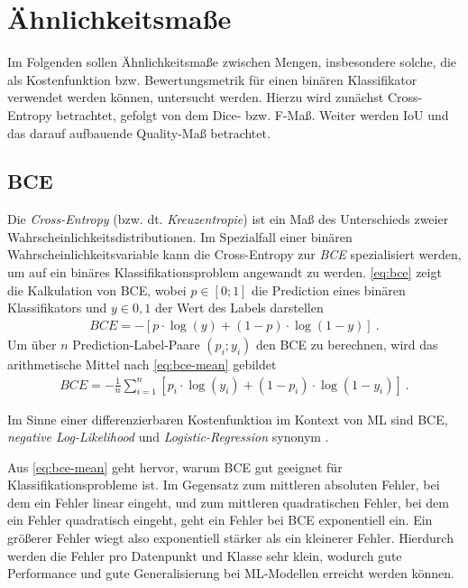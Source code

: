 \section{Ähnlichkeitsmaße}

Im Folgenden sollen Ähnlichkeitsmaße zwischen Mengen, insbesondere 
solche, die als Kostenfunktion bzw. Bewertungsmetrik für einen binären 
Klassifikator verwendet werden können, untersucht werden. Hierzu wird zunächst Cross-Entropy betrachtet,
gefolgt von dem Dice- bzw. F-Maß. Weiter werden \ac{IoU} und das darauf aufbauende Quality-Maß betrachtet.

\subsection{\acf{BCE}}

Die \textit{Cross-Entropy} (bzw. dt. \textit{Kreuzentropie}) ist ein Maß des Unterschieds zweier
Wahrscheinlichkeitsdistributionen. Im Spezialfall einer binären Wahrscheinlichkeitsvariable 
kann die Cross-Entropy zur \textit{\acf{BCE}} spezialisiert werden, um auf ein binäres 
Klassifikationsproblem angewandt zu werden. 
\autoref{eq:bce} zeigt die Kalkulation von \ac{BCE}, wobei $p \in [0;1]$ die Prediction 
eines binären Klassifikators und $y \in {0,1}$ der Wert des Labels darstellen
\begin{align}
	\label{eq:bce} BCE = -[p \cdot \log(y) + (1-p) \cdot \log(1-y) ]~.
\end{align} 
Um über $n$ Prediction-Label-Paare $(p_i; y_i)$ den \ac{BCE} zu berechnen, wird das arithmetische Mittel nach
\autoref{eq:bce-mean} gebildet \cites[S.~82]{Cybenko.1999}[S.~57--59]{Murphy.2012}
\begin{align}
	\label{eq:bce-mean} BCE = -\frac{1}{n}\sum_{i = 1}^{n}[p_i \cdot \log(y_i) + (1-p_i) \cdot \log(1-y_i) ]~.
\end{align}

Im Sinne einer differenzierbaren Kostenfunktion im Kontext von \ac{ML} sind \ac{BCE},
\textit{negative Log-Likelihood} und \textit{Logistic-Regression} synonym \cite[S.~249]{Murphy.2012}. 

Aus \autoref{eq:bce-mean} geht hervor, warum \ac{BCE} gut geeignet für Klassifikationsprobleme ist.
Im Gegensatz zum mittleren absoluten Fehler, bei dem ein Fehler linear eingeht, und zum mittleren quadratischen Fehler,
bei dem ein Fehler quadratisch eingeht, geht ein Fehler bei \ac{BCE} exponentiell ein. 
Ein größerer Fehler wiegt also exponentiell stärker als ein kleinerer Fehler. 
Hierdurch werden die Fehler pro Datenpunkt und Klasse sehr klein, 
wodurch gute Performance und gute Generalisierung bei \ac{ML}-Modellen erreicht werden können. \\

